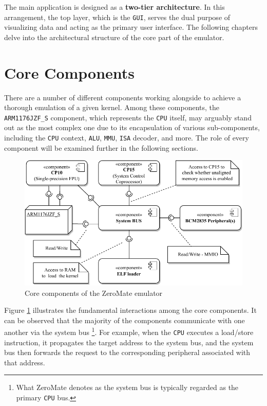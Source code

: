 \documentclass[english, ing, kiv, he, iso690numb, pdf]{fasthesis}
\begin{document}
	\newpage
	
	The main application is designed as a \textbf{two-tier architecture}. In this arrangement, the top layer, which is the \texttt{GUI}, serves the dual purpose of visualizing data and acting as the primary user interface. The following chapters delve into the architectural structure of the core part of the emulator.
	
	\section{Core Components}
	
	There are a number of different components working alongside to achieve a thorough emulation of a given kernel. Among these components, the \texttt{ARM1176JZF\_S} component, which represents the \texttt{CPU} itself, may arguably stand out as the most complex one due to its encapsulation of various sub-components, including the \texttt{CPU} context, \texttt{ALU}, \texttt{MMU}, \texttt{ISA} decoder, and more. The role of every component will be examined further in the following sections.
	
	\begin{figure}[ht]
		\centering
		\includegraphics[width=1.0\textwidth]{img/diagrams/core_component_diagram.pdf}
		\caption{Core components of the ZeroMate emulator}
		\label{Components of the core of the ZeroMate emulator}
	\end{figure}
	
	Figure \ref{Components of the core of the ZeroMate emulator} illustrates the fundamental interactions among the core components. It can be observed that the majority of the components communicate with one another via the system bus \footnote{What ZeroMate denotes as the system bus is typically regarded as the primary \texttt{CPU} bus.}. For example, when the \texttt{CPU} executes a load/store instruction, it propagates the target address to the system bus, and the system bus then forwards the request to the corresponding peripheral associated with that address.
	
\end{document}
